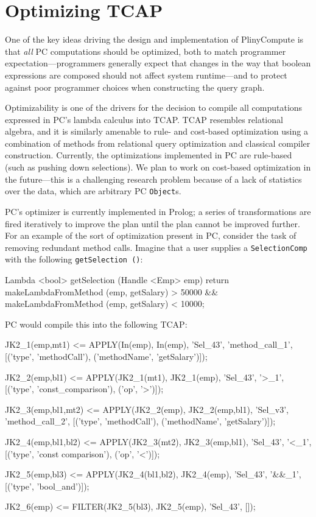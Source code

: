 
\section{Optimizing TCAP}
\label{sec:optimizer}

One of the key ideas driving the design and implementation of PlinyCompute is that \emph{all} PC computations should be optimized, both to
match programmer expectation---programmers generally expect
that changes in the way that boolean expressions are composed should not affect system runtime---and 
to protect against poor programmer choices when constructing the query graph.

Optimizability is one of the drivers for
the decision to compile all computations expressed in PC's lambda calculus into TCAP.  
TCAP resembles relational algebra, and it is similarly amenable to rule- and cost-based optimization
using a combination of methods from relational query optimization and classical compiler construction.
Currently, the optimizations implemented in PC are rule-based (such as pushing down selections).  We plan to work on cost-based optimization
in the future---this is a challenging research problem because of a lack of statistics over the data, which are arbitrary PC \texttt{Object}s.

PC's optimizer is currently implemented
in Prolog; a series of transformations are fired iteratively to improve the plan until the plan cannot be improved further.
For an example of the sort of optimization present in PC, consider the task of removing redundant method calls.  Imagine that a user
supplies a \texttt{SelectionComp} with the following \texttt{getSelection ()}:

\begin{codesmall} 
Lambda <bool> getSelection (Handle <Emp> emp) {
        return makeLambdaFromMethod (emp, getSalary) > 50000 &&
		makeLambdaFromMethod (emp, getSalary) < 10000;
}	
\end{codesmall}

\noindent PC would compile this into the following TCAP:

\begin{codesmall}
JK2_1(emp,mt1) <= APPLY(In(emp), In(emp), 'Sel_43', 'method_call_1',
  [('type', 'methodCall'), ('methodName', 'getSalary')]);

JK2_2(emp,bl1) <= APPLY(JK2_1(mt1), JK2_1(emp), 'Sel_43', '>_1', 
  [('type', 'const_comparison'), ('op', '>')]);

JK2_3(emp,bl1,mt2) <= APPLY(JK2_2(emp), JK2_2(emp,bl1), 'Sel_v3', 'method_call_2',
  [('type', 'methodCall'), ('methodName', 'getSalary')]);

JK2_4(emp,bl1,bl2) <= APPLY(JK2_3(mt2), JK2_3(emp,bl1), 'Sel_43', '<_1',
  [('type', 'const comparison'), ('op', '<')]);

JK2_5(emp,bl3) <= APPLY(JK2_4(bl1,bl2), JK2_4(emp), 'Sel_43', '&&_1', 
  [('type', 'bool_and')]);

JK2_6(emp) <= FILTER(JK2_5(bl3), JK2_5(emp), 'Sel_43', []);
\end{codesmall}

